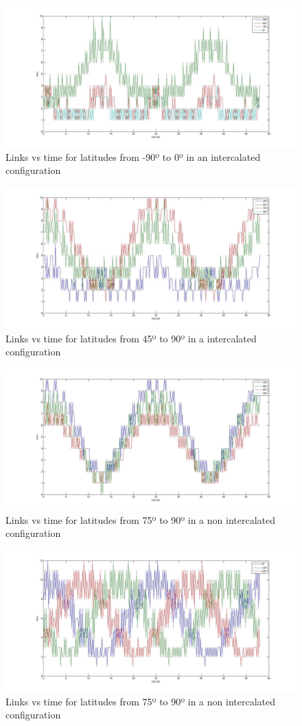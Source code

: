 \documentclass[12pt,a4paper]{report}
\begin{document}
\begin{figure}[H]
\includegraphics[scale=0.3]{-90_-60_-30_0_d.jpg}
\caption{Links vs time for latitudes from -90º to 0º in an intercalated configuration}
\end{figure}

\begin{figure}[H]
\includegraphics[scale=0.3]{45_60_75_90_d.jpg}
\caption{Links vs time for latitudes from 45º to 90º in a intercalated configuration}
\end{figure}

\begin{figure}[H]
\includegraphics[scale=0.3]{75_80_85_90_d.jpg}
\caption{Links vs time for latitudes from 75º to 90º in a non intercalated configuration}
\end{figure}

\begin{figure}[H]
\includegraphics[scale=0.3]{0_120_240_long.jpg}
\caption{Links vs time for latitudes from 75º to 90º in a non intercalated configuration}
\end{figure}
\end{document}
